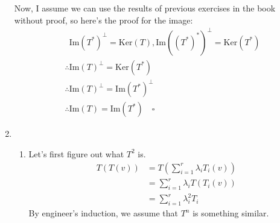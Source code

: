 \documentclass[12pt]{article}
\begin{document}
\begin{enumerate}
            Now, I assume we can use the results of previous exercises in the book without proof,
            so here's the proof for the image:
            \begin{align*}
                   & \mathrel{\phantom{\therefore}} \text{Im}(T^*)^\perp = \text{Ker}(T),
                  \text{Im}((T^*)^*)^\perp = \text{Ker}(T^*)                              \\
                   & \therefore \text{Im}(T)^\perp = \text{Ker}(T^*)                      \\
                   & \therefore \text{Im}(T)^\perp = \text{Im}(T^*)^\perp                 \\
                   & \therefore \text{Im}(T) = \text{Im}(T^*) \quad\square
            \end{align*}
      \item \begin{enumerate}
                  \item Let's first figure out what $T^2$ is.
                        \begin{align*}
                              T(T(v)) & = T\left(\sum_{i=1}^{r} \lambda_i T_i(v)\right) \\
                                      & = \sum_{i=1}^{r} \lambda_i T(T_i(v))            \\
                                      & = \sum_{i=1}^{r} \lambda_i^2 T_i
                        \end{align*}
                        By engineer's induction, we assume that $T^n$ is something similar.


\end{enumerate}
\end{enumerate}
\end{document}
